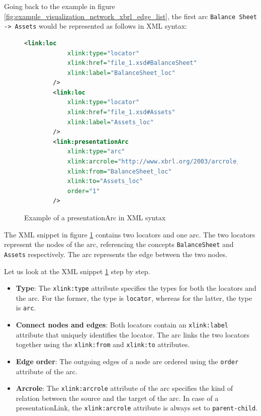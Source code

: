 Going back to the example in figure \ref{fig:example_visualization_network_xbrl_edge_list}, 
the first arc \texttt{Balance Sheet -> Assets} would be represented as follows in XML syntax:

\begin{figure}[H]
    \centering
    \begin{lstlisting}[language=XML]
        <link:loc 
            xlink:type="locator" 
            xlink:href="file_1.xsd#BalanceSheet"
            xlink:label="BalanceSheet_loc"
        />
        <link:loc 
            xlink:type="locator" 
            xlink:href="file_1.xsd#Assets"
            xlink:label="Assets_loc"
        />
        <link:presentationArc 
            xlink:type="arc" 
            xlink:arcrole="http://www.xbrl.org/2003/arcrole/parent-child" 
            xlink:from="BalanceSheet_loc" 
            xlink:to="Assets_loc"
            order="1"
        />
    \end{lstlisting}
    \caption{Example of a presentationArc in XML syntax}
    \label{fig:example_presentation_arc_xml}
\end{figure}

The XML snippet in figure \ref{fig:example_presentation_arc_xml} contains two locators and one arc.
The two locators represent the nodes of the arc, referencing the concepts \texttt{BalanceSheet} and \texttt{Assets} respectively.
The arc represents the edge between the two nodes.

Let us look at the XML snippet \ref{fig:example_presentation_arc_xml} step by step.

\begin{itemize}
    \item \textbf{Type}: The \texttt{xlink:type} attribute specifies the types for both the locators and the arc.
    For the former, the type is \texttt{locator}, whereas for the latter, the type is \texttt{arc}.
    \item \textbf{Connect nodes and edges}: Both locators contain an \texttt{xlink:label} attribute that uniquely identifies the locator.
    The arc links the two locators together using the \texttt{xlink:from} and \texttt{xlink:to} attributes.
    \item \textbf{Edge order}: The outgoing edges of a node are ordered using the \texttt{order} attribute of the arc.
    \item \textbf{Arcrole}: The \texttt{xlink:arcrole} attribute of the arc specifies the kind of relation between the source and the target of the arc.
    In case of a presentationLink, the \texttt{xlink:arcrole} attribute is always set to \texttt{parent-child}.\label{sec:arcrole}
\end{itemize}

